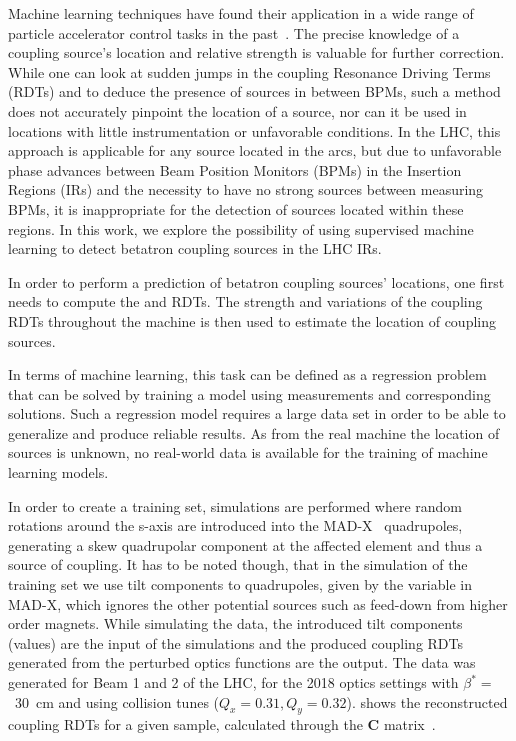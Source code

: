 Machine learning techniques have found their application in a wide range of particle accelerator control tasks in the past~\cite{elena_fol_ipac2018, edelen_neural_networks_for_control, bozoki_epac1994, meier_nn_correction_ipac2012, kijima_epac92, fol_faulty_bpms, folSupervisedLearningbasedReconstruction2021}.
The precise knowledge of a coupling source's location and relative strength is valuable for further correction.
While one can look at sudden jumps in the coupling Resonance Driving Terms (RDTs) \foneohone and \foneohoneoh to deduce the presence of sources in between BPMs, such a method does not accurately pinpoint the location of a source, nor can it be used in locations with little instrumentation or unfavorable conditions.
In the LHC, this approach is applicable for any source located in the arcs, but due to unfavorable phase advances between Beam Position Monitors (BPMs) in the Insertion Regions (IRs) and the necessity to have no strong sources between measuring BPMs, it is inappropriate for the detection of sources located within these regions.
In this work, we explore the possibility of using supervised machine learning to detect betatron coupling sources in the LHC IRs.

In order to perform a prediction of betatron coupling sources' locations, one first needs to compute the \foneohone and \foneohoneoh RDTs.
The strength and variations of the coupling RDTs throughout the machine is then used to estimate the location of coupling sources.

In terms of machine learning, this task can be defined as a regression problem that can be solved by training a model using measurements and corresponding solutions.
Such a regression model requires a large data set in order to be able to generalize and produce reliable results.
As from the real machine the location of sources is unknown, no real-world data is available for the training of machine learning models.

In order to create a training set, simulations are performed where random rotations around the s-axis are introduced into the MAD-X~\cite{MADX_guide} quadrupoles, generating a skew quadrupolar component at the affected element and thus a source of coupling.
It has to be noted though, that in the simulation of the training set we use tilt components to quadrupoles, given by the \DPSI variable in MAD-X, which ignores the other potential sources such as feed-down from higher order magnets.
While simulating the data, the introduced tilt components (\DPSI values) are the input of the simulations and the produced coupling RDTs generated from the perturbed optics functions are the output.
The data was generated for Beam 1 and 2 of the LHC, for the 2018 optics settings with \(\beta^{*} =\)~\qty{30}{\centi\metre} and using collision tunes (\(Q_x = 0.31, Q_y = 0.32\)).
 shows the reconstructed coupling RDTs for a given sample, calculated through the \textbf{C} matrix~\cite{PRAB:Calaga:Coupling_Merging_Hamiltonian_Matrix_Approaches}.


